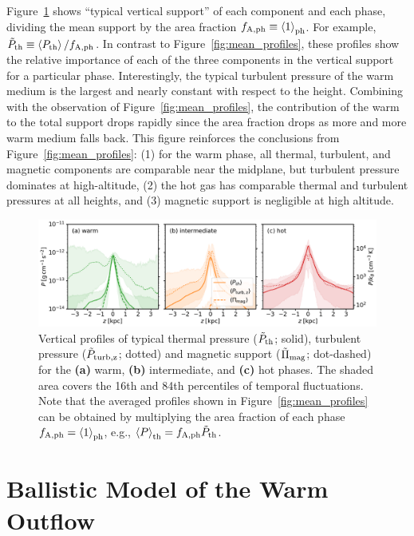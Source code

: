 \documentclass[twocolumn]{aastex62}
\newcommand\abrackets[1]{\left\langle{#1}\right\rangle}
\begin{document}
Figure~\ref{fig:typical_profiles} shows ``typical vertical support'' of each component and each phase, dividing the mean support by the area fraction $f_{\rm A,ph}\equiv\abrackets{1}_{\rm ph}$. For example, $\tilde{P}_{\rm th}\equiv\abrackets{P_{\rm th}}/f_{\rm A,ph}$. In contrast to Figure~\ref{fig:mean_profiles}, these profiles show the relative importance of each of the three components in the vertical support for a particular phase. Interestingly, the typical turbulent pressure of the warm medium is the largest and nearly constant with respect to the height. Combining with the observation of Figure~\ref{fig:mean_profiles}, the contribution of the warm to the total support drops rapidly since the area fraction drops as more and more warm medium falls back. This figure reinforces the conclusions from Figure~\ref{fig:mean_profiles}: (1) for the warm phase, all thermal, turbulent, and magnetic components are comparable near the midplane, but turbulent pressure dominates at high-altitude, (2) the hot gas has comparable thermal and turbulent pressures at all heights, and (3) magnetic support is negligible at high altitude.

\begin{figure}
	\centering
    \includegraphics[width=\textwidth]{typical_profiles.pdf}
	\caption{Vertical profiles of typical thermal pressure ($\tilde{P}_{\rm th}$; solid), turbulent pressure ($\tilde{P}_{\rm turb,z}$; dotted) and magnetic support ($\tilde{\Pi}_{\rm mag}$; dot-dashed) for the {\bf (a)} warm, {\bf (b)} intermediate, and {\bf (c)} hot  phases. The shaded area covers the 16th and 84th percentiles of temporal fluctuations. Note that the averaged profiles shown in Figure~\ref{fig:mean_profiles} can be obtained by multiplying the area fraction of each phase $f_{\rm A,ph}=\abrackets{1}_{\rm ph}$, e.g., $\abrackets{P}_{\rm th} = f_{\rm A,ph}\tilde{P}_{\rm th}$.} 
	\label{fig:typical_profiles}
\end{figure}

\section{Ballistic Model of the Warm Outflow}\label{sec:ballistic}
\end{document}
